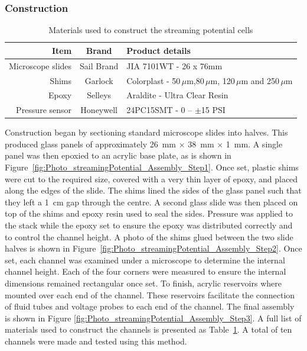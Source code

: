     \subsubsection*{Construction}

      \begin{table}
        \begin{tabular}{r|c|l}
          Item & Brand & Product details\tabularnewline\hline
          Microscope slides & Sail Brand & JIA 7101WT - 26 x 76mm\tabularnewline
          Shims & Garlock & Colorplast - 50$\,\mu$m,80$\,\mu$m, 120$\,\mu$m and 250$\,\mu$m\tabularnewline
          Epoxy & Selleys & Araldite - Ultra Clear Resin\tabularnewline
          Pressure sensor & Honeywell & 24PC15SMT - 0 -- $\pm$15 PSI\tabularnewline
        \end{tabular}
        \caption{\label{Table_StreamingCell_MaterialsUsed}Materials used to construct the streaming potential cells}
      \end{table}
      Construction began by sectioning standard microscope slides into halves.
      This produced glass panels of approximately \SI{26}{\milli\meter} $\times$ \SI{38}{\milli\meter} $\times$ \SI{1}{\milli\meter}.
      A single panel was then epoxied to an acrylic base plate, as is shown in Figure~\ref{fig:Photo_streamingPotential_Assembly_Step1}.
      Once set, plastic shims were cut to the required size, covered with a very thin layer of epoxy, and placed along the edges of the slide.
      The shims lined the sides of the glass panel such that they left a \SI{1}{\centi\meter} gap through the centre.
      A second glass slide was then placed on top of the shims and epoxy resin used to seal the sides.
      Pressure was applied to the stack while the epoxy set to ensure the epoxy was distributed correctly and to control the channel height.
      A photo of the shims glued between the two slide halves is shown in Figure~\ref{fig:Photo_streamingPotential_Assembly_Step2}.
      Once set, each channel was examined under a microscope to determine the internal channel height.
      Each of the four corners were measured to ensure the internal dimensions remained rectangular once set.
      To finish, acrylic reservoirs where mounted over each end of the channel.
      These reservoirs facilitate the connection of fluid tubes and voltage probes to each end of the channel.
      The final assembly is shown in Figure \ref{fig:Photo_streamingPotential_Assembly_Step3}.
      A full list of materials used to construct the channels is presented as Table~\ref{Table_StreamingCell_MaterialsUsed}.
      A total of ten channels were made and tested using this method.


